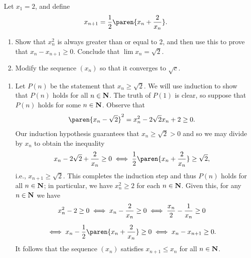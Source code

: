 \documentclass{lew98_solutions}
\begin{document}
\begin{exercise}
\label{ex:2.4.5}
    Let \( x_1 = 2 \), and define
    \[
        x_{n+1} = \frac{1}{2} \paren{ x_n + \frac{2}{x_n} }.
    \]
    \begin{enumerate}
        \item Show that \( x_n^2 \) is always greater than or equal to 2, and then use this to prove that \( x_n - x_{n+1} \geq 0 \). Conclude that \( \lim x_n = \sqrt{2} \).

        \item Modify the sequence \( (x_n) \) so that it converges to \( \sqrt{c} \).
    \end{enumerate}
\end{exercise}

\begin{solution}
    \begin{enumerate}
        \item Let \( P(n) \) be the statement that \( x_n \geq \sqrt{2} \). We will use induction to show that \( P(n) \) holds for all \( n \in \mathbf{N} \). The truth of \( P(1) \) is clear, so suppose that \( P(n) \) holds for some \( n \in \mathbf{N} \). Observe that
        \[
            \paren{ x_n - \sqrt{2} }^2 = x_n^2 - 2 \sqrt{2} x_n + 2 \geq 0.
        \]
        Our induction hypothesis guarantees that \( x_n \geq \sqrt{2} > 0 \) and so we may divide by \( x_n \) to obtain the inequality
        \[
            x_n - 2 \sqrt{2} + \frac{2}{x_n} \geq 0 \iff \frac{1}{2} \paren{ x_n + \frac{2}{x_n} } \geq \sqrt{2},
        \]
        i.e., \( x_{n+1} \geq \sqrt{2} \). This completes the induction step and thus \( P(n) \) holds for all \( n \in \mathbf{N} \); in particular, we have \( x_n^2 \geq 2 \) for each \( n \in \mathbf{N} \). Given this, for any \( n \in \mathbf{N} \) we have
        \begin{multline*}
            x_n^2 - 2 \geq 0 \iff x_n - \frac{2}{x_n} \geq 0 \iff \frac{x_n}{2} - \frac{1}{x_n} \geq 0 \\[2mm]
            \iff x_n - \frac{1}{2} \paren{ x_n + \frac{2}{x_n} } \geq 0 \iff x_n - x_{n+1} \geq 0.
        \end{multline*}
        It follows that the sequence \( (x_n) \) satisfies \( x_{n+1} \leq x_n \) for all \( n \in \mathbf{N} \).


\end{enumerate}
\end{solution}
\end{document}
